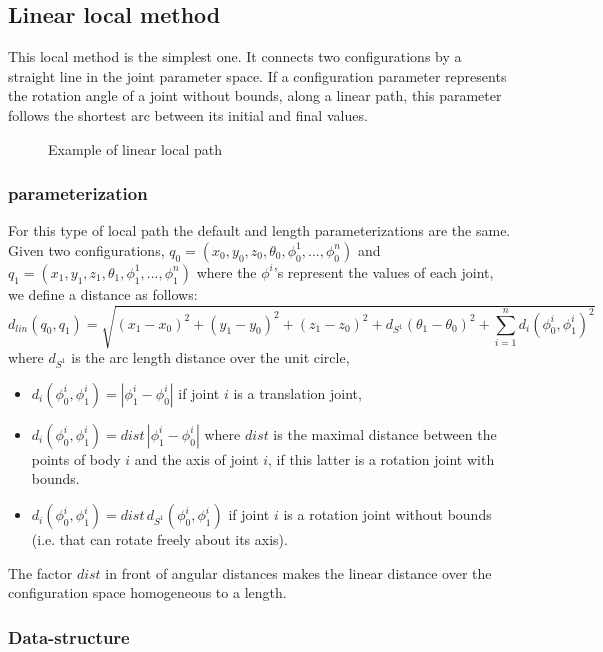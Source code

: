 \subsection{Linear local method}
\label{subsec:linear}

This local method is the simplest one. It connects two configurations
by a straight line in the joint parameter space. If a configuration
parameter represents the rotation angle of a joint without bounds,
along a linear path, this parameter follows the shortest arc between
its initial and final values.

\begin{figure}[ht]
\centerline{}
\caption{Example of linear local path}
\label{fig:linear-local}
\end{figure}

\subsubsection*{parameterization}

For this type of local path the default and length parameterizations
are the same. Given two configurations, $q_0=(x_0,y_0,z_0,\theta_0,
\phi^{1}_{0},...,\phi^{n}_{0})$ and $q_1=(x_1,y_1,z_1,\theta_1,
\phi^{1}_{1},...,\phi^{n}_{1})$ where the $\phi^i$'s represent the values 
of each joint, we define a distance as follows:
$$
d_{lin}(q_0,q_1) = \sqrt{(x_1-x_0)^2 + (y_1-y_0)^2 + (z_1-z_0)^2 + d_{S^1}(\theta_1-\theta_0)^2 + \sum_{i=1}^{n} d_i(\phi^i_0,\phi^i_1)^2}
$$
where $d_{S^1}$ is the arc length distance over the unit circle, 
\begin{itemize}
\item $d_i(\phi^i_0,\phi^i_1) = |\phi^i_1-\phi^i_0|$ if joint $i$ is a
  translation joint,
  
\item $d_i(\phi^i_0,\phi^i_1) = dist\,|\phi^i_1-\phi^i_0|$ where
  $dist$ is the maximal distance between the points of body $i$ and
  the axis of joint $i$, if this latter is a rotation joint with
  bounds.

\item $d_i(\phi^i_0,\phi^i_1) = dist\, d_{S^1}(\phi^i_0,\phi^i_1)$ if
  joint $i$ is a rotation joint without bounds (i.e. that can rotate
  freely about its axis).
\end{itemize}
The factor $dist$ in front of angular distances makes the linear
distance over the configuration space homogeneous to a length.

\subsubsection*{Data-structure}

